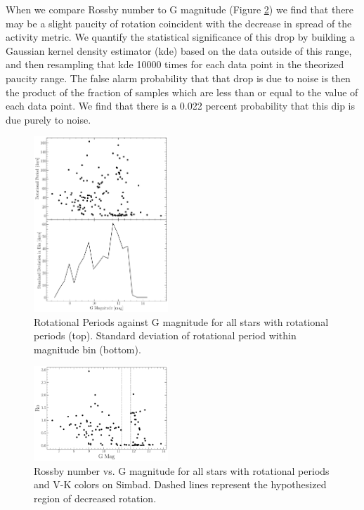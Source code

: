 When we compare Rossby number to G magnitude (Figure \ref{fig:rossby}) we find
that there may be a slight paucity of rotation coincident with the decrease in
spread of the activity metric. We quantify the statistical significance of this
drop by building a Gaussian kernel density estimator (kde) based on the data
outside of this range, and then resampling that kde 10000 times for each data
point in the theorized paucity range. The false alarm probability that that drop
is due to noise is then the product of the fraction of samples which are less
than or equal to the value of each data point. We find that there is a 0.022
percent probability that this dip is due purely to noise.


\begin{figure}
  \centering
  \includegraphics[width=0.45\textwidth]{figures/RotationSignifigance.pdf}
  \caption{Rotational Periods against G magnitude for all stars with rotational
  periods (top). Standard deviation of rotational period within magnitude bin (bottom).}
  \label{fig:rotationalSignifigance}
\end{figure}

\begin{figure}
  \centering
  \includegraphics[width=0.45\textwidth]{figures/Rossby.pdf}
  \caption{Rossby number vs. G magnitude for all stars with rotational periods
  and V-K colors on Simbad. Dashed lines represent the hypothesized region of decreased rotation.}
  \label{fig:rossby}
\end{figure}


